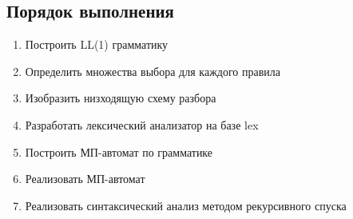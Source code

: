 \documentclass[a4paper,12pt]{article}
\begin{document}
\subsection{Порядок выполнения}
\begin{enumerate}
	\item Построить LL(1) грамматику
	\item Определить множества выбора для каждого правила
	\item Изобразить низходящую схему разбора
	\item Разработать лексический анализатор на базе lex
	\item Построить МП-автомат по грамматике
	\item Реализовать МП-автомат
	\item Реализовать синтаксический анализ методом рекурсивного спуска	
\end{enumerate}
\end{document}
